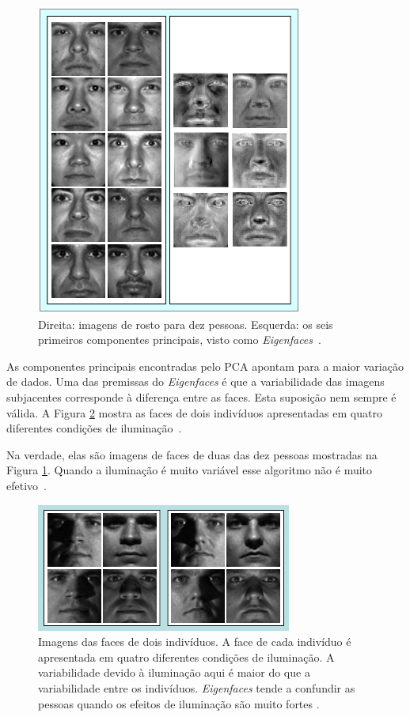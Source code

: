 	\begin{figure}[hbt]
		\begin{center}
			\includegraphics[scale=1.2]{figuras/2.FundamentacaoTeorica/eigenfaces.png}
		\end{center}
		\caption{Direita: imagens de rosto para dez pessoas. Esquerda: os seis primeiros componentes principais, visto como \textit{Eigenfaces}~\cite{hewitt}.}
		\label{exemploEigenfaces}
	\end{figure}

As componentes principais encontradas pelo PCA apontam para a maior variação de dados. Uma das premissas do \textit{Eigenfaces} é que a variabilidade das imagens subjacentes corresponde à diferença entre as faces. Esta suposição nem sempre é válida. A Figura \ref{exemplosImagensIluminacaoo} mostra as faces de dois indivíduos apresentadas em quatro diferentes condições de iluminação~\cite{hewitt}.

Na verdade, elas são imagens de faces de duas das dez pessoas mostradas na Figura \ref{exemploEigenfaces}. Quando a iluminação é muito variável esse algoritmo não é muito efetivo~\cite{hewitt}.

	\begin{figure}[hbt]
		\begin{center}
			\includegraphics[scale=1.2]{figuras/2.FundamentacaoTeorica/exemplosImagensIluminacaoo.png}
		\end{center}
		\caption{Imagens das faces de dois indivíduos. A face de cada indivíduo é apresentada em quatro diferentes condições de iluminação. A variabilidade devido à iluminação aqui é maior do que a variabilidade entre os indivíduos. \textit{Eigenfaces} tende a confundir as pessoas quando os efeitos de iluminação são muito fortes \cite{hewitt}.}
		\label{exemplosImagensIluminacaoo}
	\end{figure}


